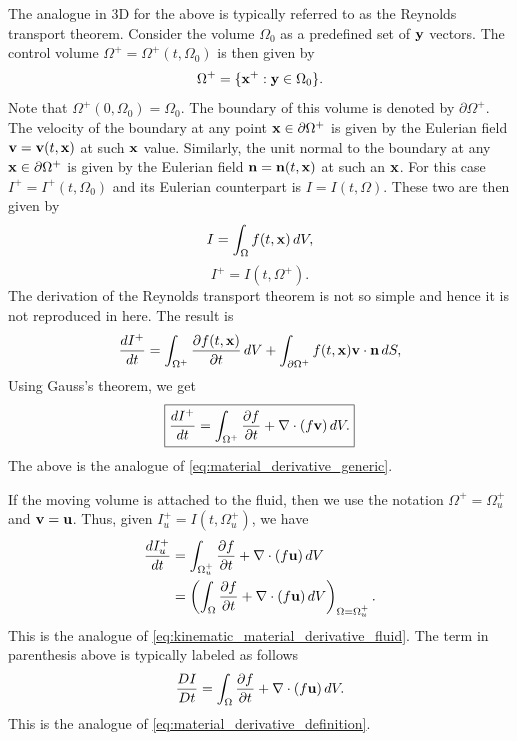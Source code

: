 \documentclass[oneside,a4paper,11pt]{report}
\begin{document}
The analogue in 3D for the above is typically referred to as the Reynolds transport theorem. Consider the volume $\Omega_0$ as a predefined set of $\mathbf{y}$ vectors. The control volume $\Omega^+ = \Omega^+(t, \Omega_0)$ is then given by
\begin{equation}
    \Omega^+ = \{ \mathbf{x}^+:\mathbf{y} \in \Omega_0 \}.
\end{equation}
Note that $\Omega^+(0,\Omega_0) = \Omega_0$. The boundary of this volume is denoted by $\partial \Omega^+$. The velocity of the boundary at any point $\mathbf{x} \in \partial \Omega^+$ is given by the Eulerian field $\mathbf{v} = \mathbf{v}(t,\mathbf{x})$ at such $\mathbf{x}$ value. Similarly, the unit normal to the boundary at any $\mathbf{x} \in \partial \Omega^+$ is given by the Eulerian field $\mathbf{n} = \mathbf{n}(t,\mathbf{x})$ at such an $\mathbf{x}$. For this case $I^+ = I^+(t,\Omega_0)$ and its Eulerian counterpart is $I = I(t,\Omega)$. These two are then given by
\begin{equation}
    I = \int_\Omega f(t,\mathbf{x}) \,dV,
\end{equation}
\begin{equation}
    I^+ = I(t,\Omega^+).
\end{equation}
The derivation of the Reynolds transport theorem is not so simple and hence it is not reproduced in here. The result is
\begin{equation}
  \frac{d I^+}{dt} = \int_{\Omega^+} \frac{\partial f(t,\mathbf{x})}{\partial t} \, dV + \int_{\partial \Omega^+} f(t,\mathbf{x}) \mathbf{v} \cdot \mathbf{n} \, dS,
\end{equation}
Using Gauss's theorem, we get
\begin{equation}
\label{eq:reynolds_transport_theorem_generic}
\boxed{
  \frac{d I^+}{dt} = \int_{\Omega^+} \frac{\partial f}{\partial t} + \nabla \cdot (f \mathbf{v} ) \, dV .
}
\end{equation}
The above is the analogue of \cref{eq:material_derivative_generic}. 

If the moving volume is attached to the fluid, then we use the notation $\Omega^+ = \Omega^+_u$ and $\mathbf{v} = \mathbf{u}$. Thus, given $I^+_u = I(t,\Omega^+_u)$, we have
\begin{align}
\label{eq:reynolds_transport_theorem_fluid}
  \frac{d I^+_u}{dt} &=  \int_{\Omega^+_u} \frac{\partial f}{\partial t} + \nabla \cdot ( f \mathbf{u} ) \, dV  \nonumber \\
  &=\left ( \int_{\Omega} \frac{\partial f}{\partial t} + \nabla \cdot ( f \mathbf{u} ) \, dV \right )_{\Omega = \Omega^+_u}.
\end{align}
This is the analogue of \cref{eq:kinematic_material_derivative_fluid}. The term in parenthesis above is typically labeled as follows
\begin{equation}
    \frac{DI}{Dt} = \int_{\Omega} \frac{\partial f}{\partial t} + \nabla \cdot ( f \mathbf{u} ) \, dV.
\end{equation}
This is the analogue of \cref{eq:material_derivative_definition}.
\end{document}

